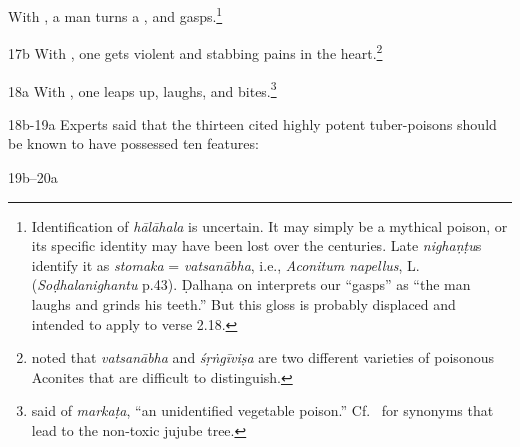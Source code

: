 \begin{translation}
    With , a man turns a , and
gasps.\footnote{Identification of \emph{hālāhala} is  uncertain. It may simply
be a mythical poison, or its specific identity may have been lost over the
centuries. Late \emph{nighaṇṭu}s identify it as \emph{stomaka} =
\emph{vatsanābha}, i.e., \emph{Aconitum napellus}, L. 
(\emph{Soḍhalanighantu}
p.43). Ḍalhaṇa on  interprets our “gasps” as “the man laughs
and grinds his teeth.”  But this gloss is probably displaced and intended to apply 
to verse 2.18.}


\item[ 17b] With , one gets violent
 and stabbing pains in the 
heart.\footnote{\citet[407]{sing-1972} noted that \emph{vatsanābha} and 
\emph{śṛṅgīviṣa} are two different varieties of poisonous Aconites that are 
difficult to distinguish.}
    
    \item[ 18a]
    With
    , one leaps up, laughs, and 
    bites.\footnote{\citet[299]{sing-1972} said of \emph{markaṭa}, “an 
    unidentified vegetable poison.”  Cf.\ \cite[v.36]{suve-2000} for synonyms that 
    lead to the non-toxic jujube tree.}
    
    
    \item[ 18b-19a]
    Experts said that the thirteen cited highly potent tuber-poisons should be known to have possessed ten features:
    \item[ 19b--20a]
    

\end{translation}
